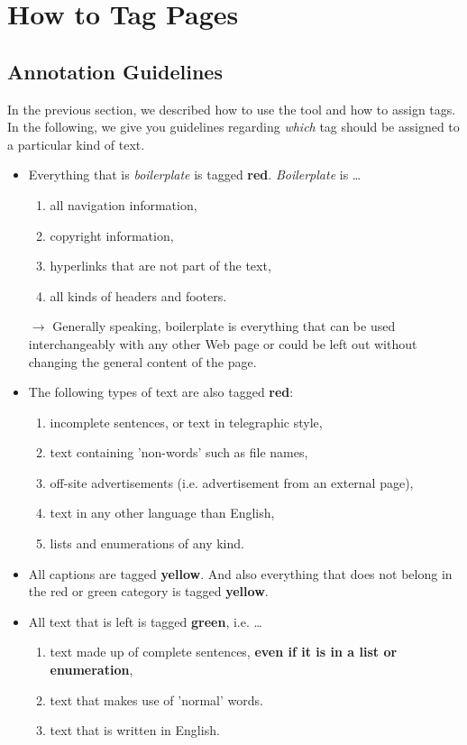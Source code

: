 \documentclass[12pt]{article}
\begin{document}
\section{How to Tag Pages}

\subsection{Annotation Guidelines}
\label{Annotation}
In the previous section, we described how to use the tool and how to assign tags. In the following, we give you guidelines regarding \emph{which} tag should be assigned to a particular kind of text.

\begin{itemize}
	\item Everything that is \emph{boilerplate} is tagged \textbf{red}. \emph{Boilerplate} is \ldots
	\begin{enumerate}
		\item all navigation information,
		\item copyright information,
		\item hyperlinks that are not part of the text,
		\item all kinds of headers and footers.
	\end{enumerate}
	$\rightarrow$ Generally speaking, boilerplate is everything that can be used interchangeably with any other Web page or could be left out without changing the general content of the page.
	\item The following types of text are also tagged \textbf{red}:
	\begin{enumerate}
		\item incomplete sentences, or text in telegraphic style,
		\item text containing 'non-words' such as file names,
		\item off-site advertisements (i.e. advertisement from an external page),
		\item text in any other language than English,
		\item lists and enumerations of any kind.
	\end{enumerate}
	\item All captions are tagged \textbf{yellow}. And also everything that does not belong in the red or green category is tagged \textbf{yellow}.
	\item All text that is left is tagged \textbf{green}, i.e. \ldots
	\begin{enumerate}
		\item text made up of complete sentences, \textbf{even if it is in a list or enumeration},
		\item text that makes use of 'normal' words.
		\item text that is written in English.
	\end{enumerate}
\end{itemize}
\end{document}
